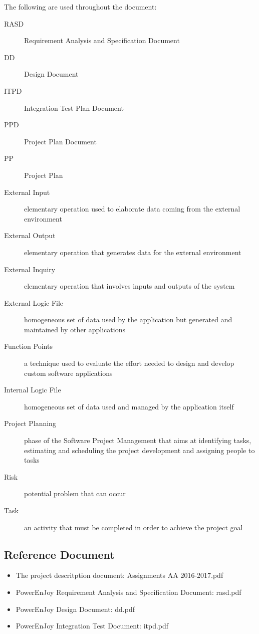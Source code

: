 	The following are used throughout the document:
	\begin{description}
		\item [RASD] Requirement Analysis and Specification Document
		\item [DD] Design Document
		\item [ITPD] Integration Test Plan Document
		\item [PPD] Project Plan Document
		\item [PP] Project Plan
		\item [External Input] elementary operation used to elaborate data coming from the external environment
		\item [External Output] elementary operation that generates data for the external environment
		\item [External Inquiry] elementary operation that involves inputs and outputs of the system
		\item [External Logic File] homogeneous set of data used by the application but generated and maintained by other applications
		\item [Function Points] a technique used to evaluate the effort needed to design and develop custom software applications
		\item [Internal Logic File] homogeneous set of data used and managed by the application itself
		\item [Project Planning] phase of the Software Project Management that aims at identifying tasks, estimating and scheduling the project development and assigning people to tasks
		\item [Risk] potential problem that can occur
		\item [Task] an activity that must be completed in order to achieve the project goal
	\end{description}


\subsection{Reference Document}
\begin{itemize}
	\item The project descritption document: Assignments AA 2016-2017.pdf
	\item PowerEnJoy Requirement Analysis and Specification Document: rasd.pdf
	\item PowerEnJoy Design Document: dd.pdf
	\item PowerEnJoy Integration Test Document: itpd.pdf
\end{itemize}
	